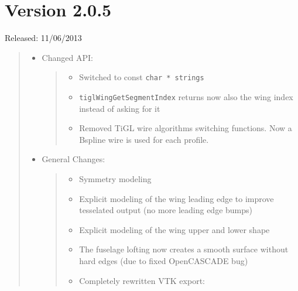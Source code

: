 \documentclass[]{scrartcl}
\begin{document}
\section{Version 2.0.5}\label{version-2.0.5}

Released: 11/06/2013

\begin{quote}
\begin{itemize}
\item
  Changed API:

  \begin{quote}
  \begin{itemize}
  \itemsep1pt\parskip0pt
  \item
    Switched to const \texttt{char * strings}
  \item
    \texttt{tiglWingGetSegmentIndex} returns now also the wing index
    instead of asking for it
  \item
    Removed TiGL wire algorithms switching functions. Now a Bspline wire
    is used for each profile.
  \end{itemize}
  \end{quote}
\item
  General Changes:

  \begin{quote}
  \begin{itemize}
  \item
    Symmetry modeling
  \item
    Explicit modeling of the wing leading edge to improve tesselated
    output (no more leading edge bumps)
  \item
    Explicit modeling of the wing upper and lower shape
  \item
    The fuselage lofting now creates a smooth surface without hard edges
    (due to fixed OpenCASCADE bug)
  \item
    Completely rewritten VTK export:


\end{itemize}
\end{quote}
\end{itemize}
\end{quote}
\end{document}

